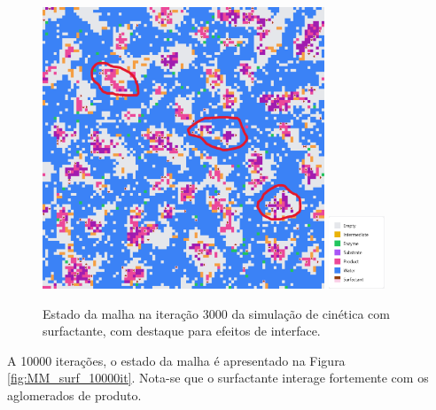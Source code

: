 \documentclass[12pt,oneside]{report}
\begin{document}
\begin{figure}[H]
    \centering
    \includegraphics[width=0.75\textwidth]{img/surf_3000.png}
    \hspace{0.05\textwidth}
    \includegraphics[width=0.15\textwidth]{img/legend_surf.png}
    \caption{\small Estado da malha na iteração 3000 da simulação de cinética com surfactante, com destaque para efeitos de interface.}
    \label{fig:MM_surf_3000it}
\end{figure}

A 10000 iterações, o estado da malha é apresentado na Figura \ref{fig:MM_surf_10000it}. Nota-se que o surfactante interage fortemente com os aglomerados de produto.
\end{document}
